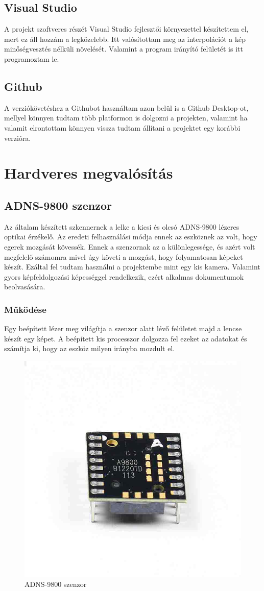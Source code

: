 \documentclass[]{thesis-ekf}
\theoremstyle{definition}
\theoremstyle{remark}
\begin{document}
\section{Visual Studio}
A projekt szoftveres részét Visual Studio\cite{visual-studio} fejlesztői környezettel készítettem el, mert ez áll hozzám a legközelebb. Itt valósítottam meg az interpolációt a kép minőségvesztés nélküli növelését. Valamint a program irányító felületét is itt programoztam le. 
\section{Github}
A verziókövetéshez a Githubot\cite{github} használtam azon belül is a Github Desktop-ot, mellyel könnyen tudtam több platformon is dolgozni a projekten, valamint ha valamit elrontottam könnyen vissza tudtam állítani a projektet egy korábbi verzióra.
\chapter{Hardveres megvalósítás}
\section{ADNS-9800 szenzor}
Az általam készített szkennernek a lelke a kicsi és olcsó ADNS-9800 lézeres optikai érzékelő. Az eredeti felhasználási módja ennek az eszköznek az volt, hogy egerek mozgását kövessék. Ennek a szenzornak az a különlegessége, és azért volt megfelelő számomra mivel úgy követi a mozgást, hogy folyamatosan képeket készít. Ezáltal fel tudtam használni a projektembe mint egy kis kamera. Valamint gyors képfeldolgozási képességgel rendelkezik, ezért alkalmas dokumentumok beolvasására. 
\subsection{Működése}
 Egy beépített lézer meg világítja a szenzor alatt lévő felületet majd a lencse készít egy képet. A beépített kis processzor dolgozza fel ezeket az adatokat és számítja ki, hogy az eszköz milyen irányba mozdult el. 
\begin{figure}[th!]
	\centering
	\includegraphics[width=0.4\linewidth]{ADNS9800base}
	\caption[ADNS9800]{ADNS-9800 szenzor}
	\label{fig:adns9800base}
\end{figure}
\end{document}
